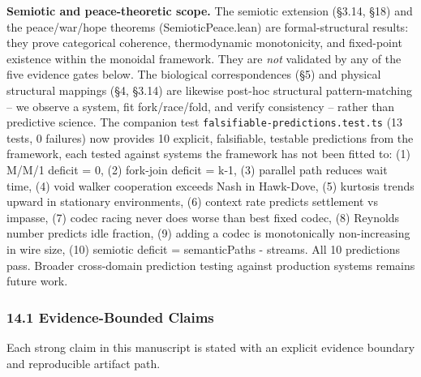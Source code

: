 \documentclass[
  11pt,
]{article}
\begin{document}
\textbf{Semiotic and peace-theoretic scope.} The semiotic extension
(§3.14, §18) and the peace/war/hope theorems (SemioticPeace.lean) are
formal-structural results: they prove categorical coherence,
thermodynamic monotonicity, and fixed-point existence within the
monoidal framework. They are \emph{not} validated by any of the five
evidence gates below. The biological correspondences (§5) and physical
structural mappings (§4, §3.14) are likewise post-hoc structural
pattern-matching -- we observe a system, fit fork/race/fold, and verify
consistency -- rather than predictive science. The companion test
\texttt{falsifiable-predictions.test.ts} (13 tests, 0 failures) now
provides 10 explicit, falsifiable, testable predictions from the
framework, each tested against systems the framework has not been fitted
to: (1) M/M/1 deficit = 0, (2) fork-join deficit = k-1, (3) parallel
path reduces wait time, (4) void walker cooperation exceeds Nash in
Hawk-Dove, (5) kurtosis trends upward in stationary environments, (6)
context rate predicts settlement vs impasse, (7) codec racing never does
worse than best fixed codec, (8) Reynolds number predicts idle fraction,
(9) adding a codec is monotonically non-increasing in wire size, (10)
semiotic deficit = semanticPaths - streams. All 10 predictions pass.
Broader cross-domain prediction testing against production systems
remains future work.

\subsubsection{14.1 Evidence-Bounded
Claims}\label{evidence-bounded-claims}

Each strong claim in this manuscript is stated with an explicit evidence
boundary and reproducible artifact path.
\end{document}
